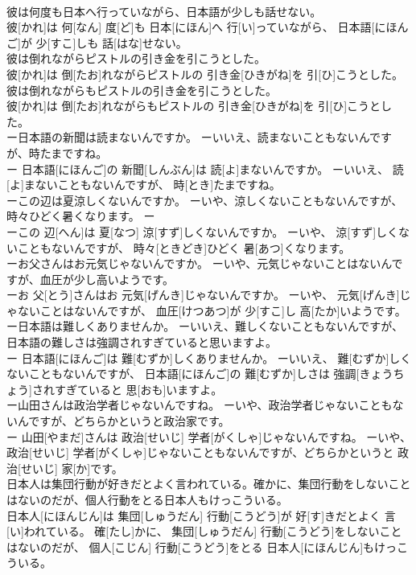 \documentclass[8pt]{extreport}
\begin{document}
\begin{CJK}{UTF8}{min}
\\	彼は何度も日本へ行っていながら、日本語が少しも話せない。	
\\	彼[かれ]は 何[なん] 度[ど]も 日本[にほん]へ 行[い]っていながら、 日本語[にほんご]が 少[すこ]しも 話[はな]せない。
\\	彼は倒れながらピストルの引き金を引こうとした。	
\\	彼[かれ]は 倒[たお]れながらピストルの 引き金[ひきがね]を 引[ひ]こうとした。
\\	彼は倒れながらもピストルの引き金を引こうとした。	
\\	彼[かれ]は 倒[たお]れながらもピストルの 引き金[ひきがね]を 引[ひ]こうとした。
\\	ー日本語の新聞は読まないんですか。 ーいいえ、読まないこともないんですが、時たまですね。	
\\	ー 日本語[にほんご]の 新聞[しんぶん]は 読[よ]まないんですか。 ーいいえ、 読[よ]まないこともないんですが、 時[とき]たまですね。
\\	ーこの辺は夏涼しくないんですか。 ーいや、涼しくないこともないんですが、時々ひどく暑くなります。	ー
\\	ーこの 辺[へん]は 夏[なつ] 涼[すず]しくないんですか。 ーいや、 涼[すず]しくないこともないんですが、 時々[ときどき]ひどく 暑[あつ]くなります。
\\	ーお父さんはお元気じゃないんですか。 ーいや、元気じゃないことはないんですが、血圧が少し高いようです。	
\\	ーお 父[とう]さんはお 元気[げんき]じゃないんですか。 ーいや、 元気[げんき]じゃないことはないんですが、 血圧[けつあつ]が 少[すこ]し 高[たか]いようです。
\\	ー日本語は難しくありませんか。 ーいいえ、難しくないこともないんですが、日本語の難しさは強調されすぎていると思いますよ。	
\\	ー 日本語[にほんご]は 難[むずか]しくありませんか。 ーいいえ、 難[むずか]しくないこともないんですが、 日本語[にほんご]の 難[むずか]しさは 強調[きょうちょう]されすぎていると 思[おも]いますよ。
\\	ー山田さんは政治学者じゃないんですね。 ーいや、政治学者じゃないこともないんですが、どちらかというと政治家です。	
\\	ー 山田[やまだ]さんは 政治[せいじ] 学者[がくしゃ]じゃないんですね。 ーいや、 政治[せいじ] 学者[がくしゃ]じゃないこともないんですが、どちらかというと 政治[せいじ] 家[か]です。
\\	日本人は集団行動が好きだとよく言われている。確かに、集団行動をしないことはないのだが、個人行動をとる日本人もけっこういる。	
\\	日本人[にほんじん]は 集団[しゅうだん] 行動[こうどう]が 好[す]きだとよく 言[い]われている。 確[たし]かに、 集団[しゅうだん] 行動[こうどう]をしないことはないのだが、 個人[こじん] 行動[こうどう]をとる 日本人[にほんじん]もけっこういる。

\end{CJK}
\end{document}
